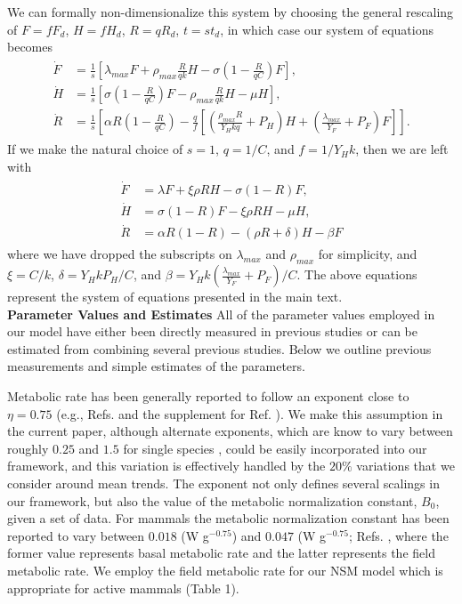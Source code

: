 \documentclass[twocolumn,preprintnumbers,amsmath,amssymb,superscriptaddress]{revtex4}
\begin{document}
We can formally non-dimensionalize this system by choosing the general rescaling of $F=fF_{d}$, $H=fH_{d}$, $R=qR_{d}$, $t=st_{d}$, in which case our system of equations becomes
\begin{align}
\begin{split}
\dot{F} &= \frac{1}{s}\left[\lambda_{max} F + \rho_{max}\frac{R}{qk}H - \sigma \left(1-\frac{R}{qC}\right)F\right],  \\
\dot{H} &= \frac{1}{s}\left[\sigma \left(1-\frac{R}{qC}\right)F - \rho_{max}\frac{R}{qk} H - \mu H\right],  \\
\dot{R} &= \frac{1}{s}\left[\alpha R\left(1-\frac{R}{qC}\right) -\frac{q}{f}\left[\left(\frac{\rho_{max}R}{Y_{H}kq}+P_{H}\right)H+\left(\frac{\lambda_{max}}{Y_{F}}+P_{F}\right) F\right]\right].
\end{split}
\end{align}
If we make the natural choice of $s=1$, $q=1/C$, and $f=1/Y_{H}k$, then we are left with
\begin{align}
\begin{split}
\dot{F} &= \lambda F + \xi \rho RH - \sigma \left(1-R\right)F,  \\
\dot{H} &= \sigma \left(1-R\right)F - \xi \rho RH - \mu H,  \\
\dot{R} &= \alpha R\left(1-R\right) -\left(\rho R+\delta\right)H-\beta F
\end{split}
\end{align}
where we have dropped the subscripts on $\lambda_{max}$ and $\rho_{max}$ for simplicity, and $\xi=C/k$, $\delta=Y_{H}kP_{H}/C$, and $\beta=Y_{H}k\left(\frac{\lambda_{max}}{Y_{F}}+P_{F}\right)/C$. The above equations represent the system of equations presented in the main text.
\\

{\bf Parameter Values and Estimates}
All of the parameter values employed in our model have either been directly measured in previous studies or can be estimated from combining several previous studies. Below we outline previous measurements and simple estimates of the parameters.

Metabolic rate has been generally reported to follow an exponent close to $\eta=0.75$ (e.g., Refs. \citep{West:2001bv,moses2008rmo} and the supplement for Ref. \citep{hou}). We make this assumption in the current paper, although alternate exponents, which are know to vary between roughly $0.25$ and $1.5$ for single species \citep{moses2008rmo}, could be easily incorporated into our framework, and this variation is effectively handled by the $20\%$ variations that we consider around mean trends. The exponent not only defines several scalings in our framework, but also the value of the metabolic normalization constant, $B_{0}$, given a set of data.  For mammals the metabolic normalization constant has been reported to vary between $0.018$ (W g$^{-0.75}$) and $0.047$ (W g$^{-0.75}$; Refs. \citep{hou,West:2001bv}, where the former value represents basal metabolic rate and the latter represents the field metabolic rate. We employ the field metabolic rate for our NSM model which is appropriate for active mammals (Table 1).
\end{document}
